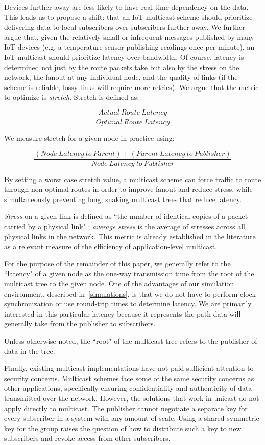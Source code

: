 Devices further away are less likely to have real-time dependency on the data. This leads us to propose a shift: that an IoT multicast scheme should prioritize delivering data to local subscribers over subscribers further away. We further argue that, given the relatively small or infrequent messages published by many IoT devices (e.g. a temperature sensor publishing readings once per minute), an IoT multicast should prioritize latency over bandwidth. Of course, latency is determined not just by the route packets take but also by the stress on the network, the fanout at any individual node, and the quality of links (if the scheme is reliable, lossy links will require more retries). We argue that the metric to optimize is \textit{stretch}. Stretch is defined as:

\[\frac{Actual\: Route\: Latency}{Optimal\: Route\: Latency}\]

We measure stretch for a given node in practice using:

\[\frac{(Node\: Latency\: to\: Parent) + (Parent\: Latency\: to\: Publisher)}{Node\: Latency\: to\: Publisher}\]

By setting a worst case stretch value, a multicast scheme can force traffic to route through non-optimal routes in order to improve fanout and reduce stress, while simultaneously preventing long, snaking multicast trees that reduce latency.

\textit{Stress} on a given link is defined as ``the number of identical copies of a packet carried by a physical link" \cite{narada}; \textit{average stress} is the average of stresses across all physical links in the network. This metric is already established in the literature as a relevant measure of the efficiency of application-level multicast.

For the purpose of the remainder of this paper, we generally refer to the ``latency" of a given node as the one-way transmission time from the root of the multicast tree to the given node. One of the advantages of our simulation environment, described in~\autoref{simulations}, is that we do not have to perform clock synchronization or use round-trip times to determine latency. We are primarily interested in this particular latency because it represents the path data will generally take from the publisher to subscribers.

Unless otherwise noted, the ``root" of the multicast tree refers to the publisher of data in the tree.

Finally, existing multicast implementations have not paid sufficient attention to security concerns. Multicast schemes face some of the same security concerns as other applications, specifically ensuring confidentiality and authenticity of data transmitted over the network. However, the solutions that work in unicast do not apply directly to multicast. The publisher cannot negotiate a separate key for every subscriber in a system with any amount of scale.  Using a shared symmetric key for the group raises the question of how to distribute such a key to new subscribers and revoke access from other subscribers. 

